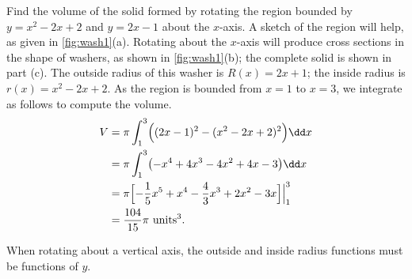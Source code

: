 \begin{example}\label{ex_wash1}
Find the volume of the solid formed by rotating the region bounded by $y=x^2-2x+2$ and $y=2x-1$ about the $x$-axis.
\solution
A sketch of the region will help, as given in \autoref{fig:wash1}(a). Rotating about the $x$-axis will produce cross sections in the shape of washers, as shown in \autoref{fig:wash1}(b); the complete solid is shown in part (c). The outside radius of this washer is $R(x) = 2x+1$; the inside radius is $r(x) = x^2-2x+2$. As the region is bounded from $x=1$ to $x=3$, we integrate as follows to compute the volume.
\begin{align*}
V &= \pi\int_1^3 \Bigl((2x-1)^2-(x^2-2x+2)^2\Bigr)\dd x \\
		&= \pi\int_1^3 \bigl(-x^4+4x^3-4x^2+4x-3\bigr)\dd x \\
		&= \pi\Bigl[-\frac{1}{5}x^5+x^4-\frac43x^3+2x^2-3x\Bigr]\Big|_1^3 \\
		&=\frac{104}{15}\pi %
		\ \text{units}^3.
\end{align*}
\end{example}

When rotating about a vertical axis, the outside and inside radius functions must be functions of $y$.


